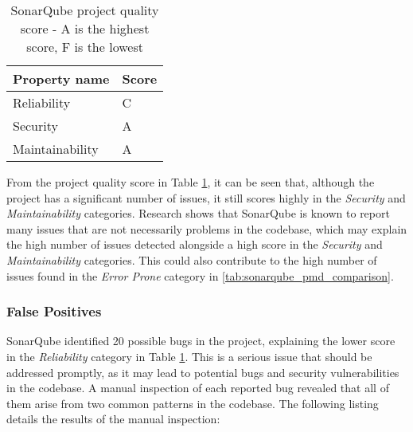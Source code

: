 \begin{table}[H]
  \label{tab:sonar_project_quality}
  \begin{center}
    \begin{tabular}[c]{l|l}
      \hline
      \multicolumn{1}{c|}{\textbf{Property name}} & 
      \multicolumn{1}{c}{\textbf{Score}} \\
      \hline
      Reliability & C \\
      Security & A \\
      Maintainability & A \\
      \hline
    \end{tabular}
  \end{center}
  \caption{SonarQube project quality score - A is the highest score, F is the lowest}
\end{table}

\noindent From the project quality score in Table \ref{tab:sonar_project_quality}, it can be seen that, although the project has a significant number of issues, it still scores highly in the \textit{Security} and \textit{Maintainability} categories. Research shows that SonarQube is known to report many issues that are not necessarily problems in the codebase, which may explain the high number of issues detected alongside a high score in the \textit{Security} and \textit{Maintainability} categories. This could also contribute to the high number of issues found in the \textit{Error Prone} category in \autoref{tab:sonarqube_pmd_comparison}.

\subsubsection{False Positives}

SonarQube identified 20 possible bugs in the project, explaining the lower score in the \textit{Reliability} category in Table \ref{tab:sonar_project_quality}. This is a serious issue that should be addressed promptly, as it may lead to potential bugs and security vulnerabilities in the codebase. A manual inspection of each reported bug revealed that all of them arise from two common patterns in the codebase. The following listing details the results of the manual inspection:

